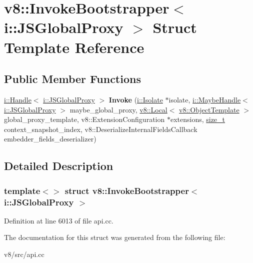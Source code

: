 \hypertarget{structv8_1_1InvokeBootstrapper_3_01i_1_1JSGlobalProxy_01_4}{}\section{v8\+:\+:Invoke\+Bootstrapper$<$ i\+:\+:J\+S\+Global\+Proxy $>$ Struct Template Reference}
\label{structv8_1_1InvokeBootstrapper_3_01i_1_1JSGlobalProxy_01_4}
\subsection*{Public Member Functions}
\begin{DoxyCompactItemize}
\item 
\mbox{\label{structv8_1_1InvokeBootstrapper_3_01i_1_1JSGlobalProxy_01_4_a2afbb5c7d9a9d953d792deea57af9d50}} 
\mbox{\hyperlink{classv8_1_1internal_1_1Handle}{i\+::\+Handle}}$<$ \mbox{\hyperlink{classv8_1_1internal_1_1JSGlobalProxy}{i\+::\+J\+S\+Global\+Proxy}} $>$ {\bfseries Invoke} (\mbox{\hyperlink{classv8_1_1internal_1_1Isolate}{i\+::\+Isolate}} $\ast$isolate, \mbox{\hyperlink{classv8_1_1internal_1_1MaybeHandle}{i\+::\+Maybe\+Handle}}$<$ \mbox{\hyperlink{classv8_1_1internal_1_1JSGlobalProxy}{i\+::\+J\+S\+Global\+Proxy}} $>$ maybe\+\_\+global\+\_\+proxy, \mbox{\hyperlink{classv8_1_1Local}{v8\+::\+Local}}$<$ \mbox{\hyperlink{classv8_1_1ObjectTemplate}{v8\+::\+Object\+Template}} $>$ global\+\_\+proxy\+\_\+template, v8\+::\+Extension\+Configuration $\ast$extensions, \mbox{\hyperlink{classsize__t}{size\+\_\+t}} context\+\_\+snapshot\+\_\+index, v8\+::\+Deserialize\+Internal\+Fields\+Callback embedder\+\_\+fields\+\_\+deserializer)
\end{DoxyCompactItemize}


\subsection{Detailed Description}
\subsubsection*{template$<$$>$\newline
struct v8\+::\+Invoke\+Bootstrapper$<$ i\+::\+J\+S\+Global\+Proxy $>$}



Definition at line 6013 of file api.\+cc.



The documentation for this struct was generated from the following file\+:\begin{DoxyCompactItemize}
\item 
v8/src/api.\+cc\end{DoxyCompactItemize}
